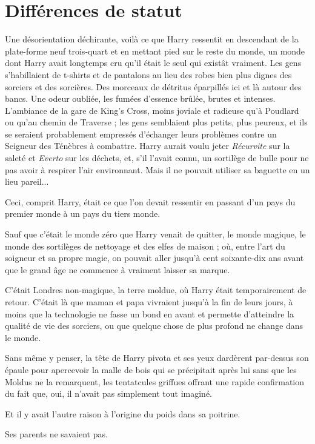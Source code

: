 
\chapter{Différences de statut}

Une désorientation déchirante, voilà ce que Harry ressentit en descendant de la plate-forme neuf trois-quart et en mettant pied sur le reste du monde, un monde dont Harry avait longtemps cru qu'il était le seul qui existât vraiment. Les gens s'habillaient de t-shirts et de pantalons au lieu des robes bien plus dignes des sorciers et des sorcières. Des morceaux de détritus éparpillés ici et là autour des bancs. Une odeur oubliée, les fumées d'essence brûlée, brutes et intenses. L'ambiance de la gare de King's Cross, moins joviale et radieuse qu'à Poudlard ou qu'au chemin de Traverse ; les gens semblaient plus petits, plus peureux, et ils se seraient probablement empressés d'échanger leurs problèmes contre un Seigneur des Ténèbres à combattre. Harry aurait voulu jeter \emph{Récurvite}  sur la saleté et \emph{Everto}  sur les déchets, et, s'il l'avait connu, un sortilège de bulle pour ne pas avoir à respirer l'air environnant. Mais il ne pouvait utiliser sa baguette en un lieu pareil...

Ceci, comprit Harry, était ce que l'on devait ressentir en passant d'un pays du premier monde à un pays du tiers monde.

Sauf que c'était le monde zéro que Harry venait de quitter, le monde magique, le monde des sortilèges de nettoyage et des elfes de maison ; où, entre l'art du soigneur et sa propre magie, on pouvait aller jusqu'à cent soixante-dix ans avant que le grand âge ne commence à vraiment laisser sa marque.

C'était Londres non-magique, la terre moldue, où Harry était temporairement de retour. C'était là que maman et papa vivraient jusqu'à la fin de leurs jours, à moins que la technologie ne fasse un bond en avant et permette d'atteindre la qualité de vie des sorciers, ou que quelque chose de plus profond ne change dans le monde.

Sans même y penser, la tête de Harry pivota et ses yeux dardèrent par-dessus son épaule pour apercevoir la malle de bois qui se précipitait après lui sans que les Moldus ne la remarquent, les tentatcules griffues offrant une rapide confirmation du fait que, oui, il n'avait pas simplement tout imaginé.

Et il y avait l'autre raison à l'origine du poids dans sa poitrine.

Ses parents ne savaient pas.

